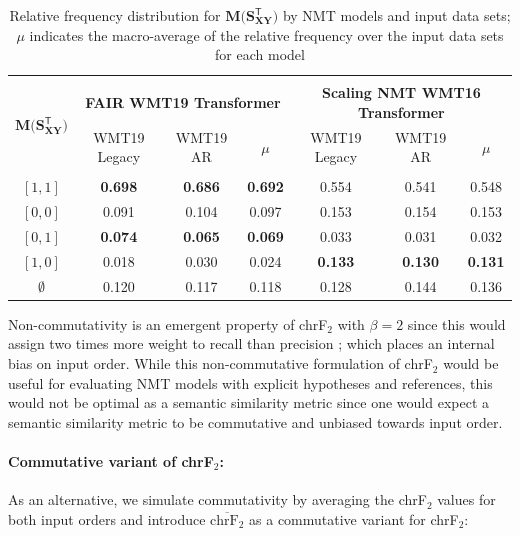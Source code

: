 \documentclass[11pt,a4paper]{article}
\begin{document}
\begin{table}[t!]
  \centering
  \begin{tabular*}{\textwidth}{c @{\extracolsep{\fill}} cccccc}
    \hline \\[-10pt]
    \multirow{2}[3]{*}{$\mathbf{M(S_{XY}^{\mathsf{T}}})$} & \multicolumn{3}{c}{\textbf{FAIR WMT19 Transformer}} & \multicolumn{3}{c}{\textbf{Scaling NMT WMT16 Transformer}} \\
    \cmidrule(lr){2-4} \cmidrule(lr){5-7}
    & WMT19 Legacy & WMT19 AR & $\mu$ & WMT19 Legacy & WMT19 AR & $\mu$ \\[3pt]
    \hline \hline \\[-10pt]
    $[1,1]$ & \textbf{0.698} & \textbf{0.686} & \textbf{0.692} & 0.554 & 0.541 & 0.548 \\
    $[0,0]$ & 0.091 & 0.104 & 0.097 & 0.153 & 0.154 & 0.153 \\
    $[0,1]$ & \textbf{0.074} & \textbf{0.065} & \textbf{0.069} & 0.033 & 0.031 & 0.032 \\
    $[1,0]$ & 0.018 & 0.030 & 0.024 & \textbf{0.133} & \textbf{0.130} & \textbf{0.131}\\
    $\emptyset$ & 0.120 & 0.117 & 0.118 & 0.128 & 0.144 & 0.136 \\
    \hline
  \end{tabular*}
  \caption{Relative frequency distribution for $\mathbf{M(S_{XY}^{\mathsf{T}}})$ by NMT models and input data sets; $\mu$ indicates the macro-average of the relative frequency over the input data sets for each model}
  \label{isometry_frequency}
\end{table}

Non-commutativity is an emergent property of chrF$_2$ with $\beta = 2$ since this would assign two times more weight to recall than precision \cite{popovic2015chrf}; which places an internal bias on input order. While this non-commutative formulation of chrF$_2$ would be useful for evaluating NMT models with explicit hypotheses and references, this would not be optimal as a semantic similarity metric since one would expect a semantic similarity metric to be commutative and unbiased towards input order.

\paragraph{Commutative variant of chrF$_2$:} As an alternative, we simulate commutativity by averaging the chrF$_2$ values for both input orders and introduce $\overline{\text{chrF}_2}$ as a commutative variant for chrF$_2$:
\end{document}
